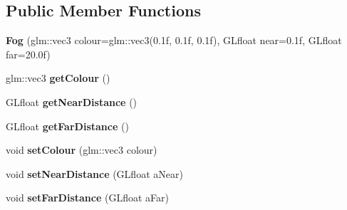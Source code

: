 \subsection*{Public Member Functions}
\begin{DoxyCompactItemize}
\item 
{\bfseries Fog} (glm\+::vec3 colour=glm\+::vec3(0.\+1f, 0.\+1f, 0.\+1f), G\+Lfloat near=0.\+1f, G\+Lfloat far=20.\+0f)\hypertarget{classflw_1_1flf_1_1Fog_a2bfdacc7a2c9b4320af0ad5dbe2989e8}{}\label{classflw_1_1flf_1_1Fog_a2bfdacc7a2c9b4320af0ad5dbe2989e8}

\item 
glm\+::vec3 {\bfseries get\+Colour} ()\hypertarget{classflw_1_1flf_1_1Fog_ae70d98849f2f0d569eb79177cfb00c1c}{}\label{classflw_1_1flf_1_1Fog_ae70d98849f2f0d569eb79177cfb00c1c}

\item 
G\+Lfloat {\bfseries get\+Near\+Distance} ()\hypertarget{classflw_1_1flf_1_1Fog_acdc4eec649e8e103e826b27d078b9b78}{}\label{classflw_1_1flf_1_1Fog_acdc4eec649e8e103e826b27d078b9b78}

\item 
G\+Lfloat {\bfseries get\+Far\+Distance} ()\hypertarget{classflw_1_1flf_1_1Fog_a47fa640d7ac15c6f00865fb65d9200c5}{}\label{classflw_1_1flf_1_1Fog_a47fa640d7ac15c6f00865fb65d9200c5}

\item 
void {\bfseries set\+Colour} (glm\+::vec3 colour)\hypertarget{classflw_1_1flf_1_1Fog_a878c0fe57d32ed19b953a2b80049df51}{}\label{classflw_1_1flf_1_1Fog_a878c0fe57d32ed19b953a2b80049df51}

\item 
void {\bfseries set\+Near\+Distance} (G\+Lfloat a\+Near)\hypertarget{classflw_1_1flf_1_1Fog_a92734a69fca7b000d3656642971624c4}{}\label{classflw_1_1flf_1_1Fog_a92734a69fca7b000d3656642971624c4}

\item 
void {\bfseries set\+Far\+Distance} (G\+Lfloat a\+Far)\hypertarget{classflw_1_1flf_1_1Fog_abcd9c04cd7c8a793e63409ee7a8ba82a}{}\label{classflw_1_1flf_1_1Fog_abcd9c04cd7c8a793e63409ee7a8ba82a}


\end{DoxyCompactItemize}
